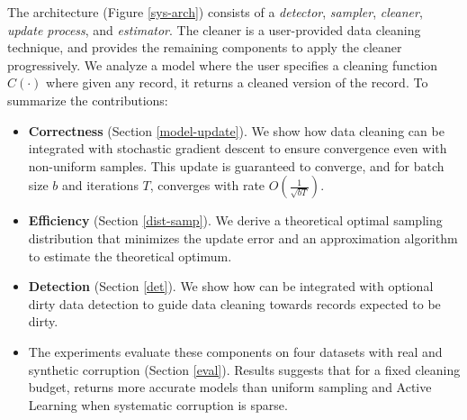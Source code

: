 The \sys architecture (Figure \ref{sys-arch}) consists of a \emph{detector}, \emph{sampler}, \emph{cleaner}, \emph{update process}, and \emph{estimator}.
The cleaner is a user-provided data cleaning technique, and \sys provides the remaining components to apply the cleaner progressively.
We analyze a model where the user specifies a cleaning function $C(\cdot)$ where given any record, it returns a cleaned version of the record.
To summarize the contributions:
\begin{itemize}[noitemsep]
\item \textbf{Correctness} (Section \ref{model-update}). We show how data cleaning can be integrated with stochastic gradient descent to ensure convergence even with non-uniform samples. This update is guaranteed to converge, and for batch size $b$ and iterations $T$, converges with rate $O(\frac{1}{\sqrt{bT}})$. 
\item \textbf{Efficiency} (Section \ref{dist-samp}). We derive a theoretical optimal sampling distribution that minimizes the update error and an approximation algorithm to estimate the theoretical optimum.
\item \textbf{Detection} (Section \ref{det}). We show how \sys can be integrated with optional dirty data detection to guide data cleaning towards records expected to be dirty.
\item The experiments evaluate these components on four datasets with real and synthetic corruption (Section \ref{eval}). Results suggests that for a fixed cleaning budget, \sys returns more accurate models than uniform sampling and Active Learning when systematic corruption is sparse.

\end{itemize}






